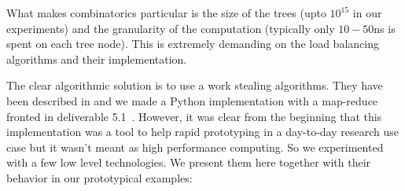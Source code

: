 \documentclass{deliverablereport}
\begin{document}
What makes combinatorics particular is the size of the trees (upto $10^{15}$
in our experiments) and the granularity of the computation (typically only
$10-50$ns is spent on each tree node). This is extremely demanding on the load
balancing algorithms and their implementation.

The clear algorithmic solution is to use a work stealing algorithms. They have
been described in \cite{10.1109/SFCS.1994.365680, BlumofeL99} and we made a
Python implementation with a map-reduce fronted in deliverable
5.1~\cite{map-reduce}. However, it was clear from the beginning that this
implementation was a tool to help rapid prototyping in a day-to-day research
use case but it wasn't meant as high performance computing. So we experimented
with a few low level technologies. We present them here together with their
behavior in our prototypical examples:
\end{document}
